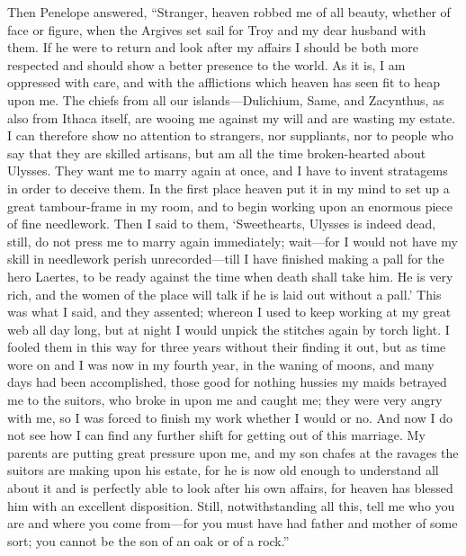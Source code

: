 Then Penelope answered, “Stranger, heaven robbed me of all beauty, whether of
face or figure, when the Argives set sail for Troy and my dear husband with
them. If he were to return and look after my affairs I should be both more
respected and should show a better presence to the world. As it is, I am
oppressed with care, and with the afflictions which heaven has seen fit to heap
upon me. The chiefs from all our islands—Dulichium, Same, and Zacynthus, as
also from Ithaca itself, are wooing me against my will and are wasting my
estate. I can therefore show no attention to strangers, nor suppliants, nor to
people who say that they are skilled artisans, but am all the time
broken-hearted about Ulysses. They want me to marry again at once, and I have
to invent stratagems in order to deceive them. In the first place heaven put it
in my mind to set up a great tambour-frame in my room, and to begin working
upon an enormous piece of fine needlework. Then I said to them, ‘Sweethearts,
Ulysses is indeed dead, still, do not press me to marry again immediately;
wait—for I would not have my skill in needlework perish unrecorded—till I have
finished making a pall for the hero Laertes, to be ready against the time when
death shall take him. He is very rich, and the women of the place will talk if
he is laid out without a pall.’ This was what I said, and they assented;
whereon I used to keep working at my great web all day long, but at night I
would unpick the stitches again by torch light. I fooled them in this way for
three years without their finding it out, but as time wore on and I was now in
my fourth year, in the waning of moons, and many days had been accomplished,
those good for nothing hussies my maids betrayed me to the suitors, who broke
in upon me and caught me; they were very angry with me, so I was forced to
finish my work whether I would or no. And now I do not see how I can find any
further shift for getting out of this marriage. My parents are putting great
pressure upon me, and my son chafes at the ravages the suitors are making upon
his estate, for he is now old enough to understand all about it and is
perfectly able to look after his own affairs, for heaven has blessed him with
an excellent disposition. Still, notwithstanding all this, tell me who you are
and where you come from—for you must have had father and mother of some sort;
you cannot be the son of an oak or of a rock.”

